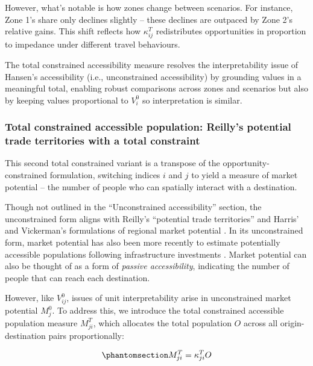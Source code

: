 \documentclass[
  10pt,
  letterpaper,
]{article}
\begin{document}
However, what's notable is how zones change between scenarios. For
instance, Zone 1's share only declines slightly -- these declines are
outpaced by Zone 2's relative gains. This shift reflects how
\(\kappa_{ij}^T\) redistributes opportunities in proportion to impedance
under different travel behaviours.

The total constrained accessibility measure resolves the
interpretability issue of Hansen's accessibility (i.e., unconstrained
accessibility) by grounding values in a meaningful total, enabling
robust comparisons across zones and scenarios but also by keeping values
proportional to \(V_i^0\) so interpretation is similar.

\subsubsection{Total constrained accessible population: Reilly's
potential trade territories with a total
constraint}\label{total-constrained-accessible-population-reillys-potential-trade-territories-with-a-total-constraint}

This second total constrained variant is a transpose of the
opportunity-constrained formulation, switching indices \(i\) and \(j\)
to yield a measure of market potential -- the number of people who can
spatially interact with a destination.

Though not outlined in the ``Unconstrained accessibility'' section, the
unconstrained form aligns with Reilly's ``potential trade territories''
\citep{reilly1929methods} and Harris' and Vickerman's formulations of
regional market potential
\citep{harris_market_1954, vickermanAccessibilityAttractionPotential1974}.
In its unconstrained form, market potential has also been more recently
to estimate potentially accessible populations following infrastructure
investments
\citep[e.g.,][]{gutierrezLocationEconomicPotential2001, holl2007twenty, condecco2018road}.
Market potential can also be thought of as a form of \emph{passive
accessibility}, indicating the number of people that can reach each
destination.

However, like \(V_{ij}^0\), issues of unit interpretability arise in
unconstrained market potential \(M_j^0\). To address this, we introduce
the total constrained accessible population measure \(M^T_{ji}\), which
allocates the total population \(O\) across all origin-destination pairs
proportionally:

\begin{equation}\phantomsection\label{eq-total-constrained-market}{
M^T_{ji} = \kappa_{ji}^T O
}\end{equation}
\end{document}
